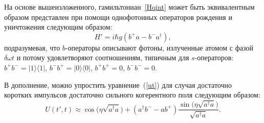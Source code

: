На основе вышеизложенного, гамильтониан~\eqref{Hqint} может быть эквивалентным образом представлен при помощи однофотонных операторов рождения и уничтожения следующим образом: 
\begin{equation}
	H' = i\hbar g (b^+ a - b^- a^\dag),
	\label{Hqintb}
\end{equation}
подразумевая, что $b$-операторы описывают фотоны, излученные атомом с фазой $\delta\omega t$ и потому удовлетворяют соотношениям, типичным для $s$-операторов: $b^+b^- = |1\rangle\langle 1|$, $b^-b^+ = |0\rangle\langle 0|$, $b^+b^+ = 0$, $b^-b^- = 0$. 

В дополнение, можно упростить уравнение~(\ref{ut}) для случая достаточно коротких импульсов достаточно сильного когерентного поля следующим образом: 
%
%
\begin{equation}
	U(t',t) \approx \cos{\big(\eta \sqrt{a^\dag a}\big)} + (a^\dag b^- - a b^+) \frac{\sin{\big(\eta \sqrt{a^\dag a}\big)}}{\sqrt{a^\dag a}}.	
	\label{u1}
\end{equation}


